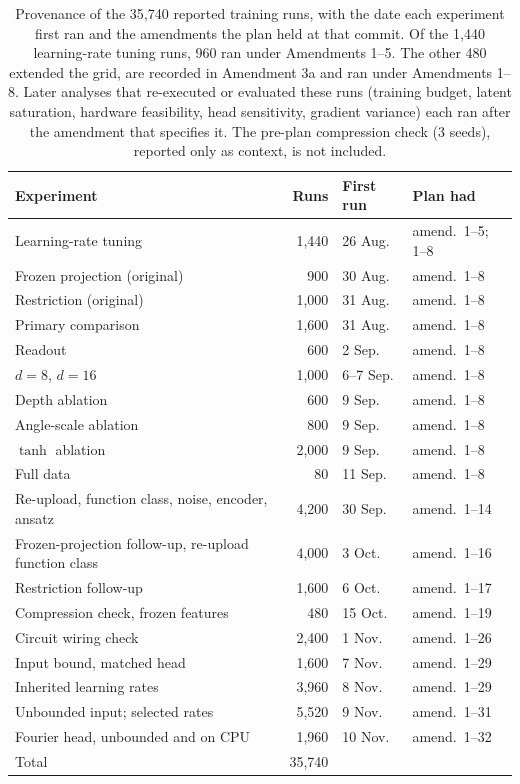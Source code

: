 \documentclass{ieeeaccess}
\begin{document}
\begin{table}[h]
\caption{Provenance of the 35,740 reported training runs, with the date each experiment first ran and the amendments the plan held at that commit. Of the 1,440 learning-rate tuning runs, 960 ran under Amendments 1--5. The other 480 extended the grid, are recorded in Amendment 3a and ran under Amendments 1--8. Later analyses that re-executed or evaluated these runs (training budget, latent saturation, hardware feasibility, head sensitivity, gradient variance) each ran after the amendment that specifies it. The pre-plan compression check (3 seeds), reported only as context, is not included.}
\label{tab:provenance}
\centering
\setlength{\tabcolsep}{3pt}
\footnotesize
\begin{tabular}{@{}L{3.9cm}rll@{}}
\toprule
Experiment & Runs & First run & Plan had\\
\midrule
Learning-rate tuning & 1,440 & 26 Aug. & amend.\ 1--5; 1--8\\
Frozen projection (original) & 900 & 30 Aug. & amend.\ 1--8\\
Restriction (original) & 1,000 & 31 Aug. & amend.\ 1--8\\
Primary comparison & 1,600 & 31 Aug. & amend.\ 1--8\\
Readout & 600 & 2 Sep. & amend.\ 1--8\\
$d=8$, $d=16$ & 1,000 & 6--7 Sep. & amend.\ 1--8\\
Depth ablation & 600 & 9 Sep. & amend.\ 1--8\\
Angle-scale ablation & 800 & 9 Sep. & amend.\ 1--8\\
$\tanh$ ablation & 2,000 & 9 Sep. & amend.\ 1--8\\
Full data & 80 & 11 Sep. & amend.\ 1--8\\
Re-upload, function class, noise, encoder, ansatz & 4,200 & 30 Sep. & amend.\ 1--14\\
Frozen-projection follow-up, re-upload function class & 4,000 & 3 Oct. & amend.\ 1--16\\
Restriction follow-up & 1,600 & 6 Oct. & amend.\ 1--17\\
Compression check, frozen features & 480 & 15 Oct. & amend.\ 1--19\\
Circuit wiring check & 2,400 & 1 Nov. & amend.\ 1--26\\
Input bound, matched head & 1,600 & 7 Nov. & amend.\ 1--29\\
Inherited learning rates & 3,960 & 8 Nov. & amend.\ 1--29\\
Unbounded input; selected rates & 5,520 & 9 Nov. & amend.\ 1--31\\
Fourier head, unbounded and on CPU & 1,960 & 10 Nov. & amend.\ 1--32\\
\midrule
Total & 35,740 & & \\
\bottomrule
\end{tabular}
\end{table}
\end{document}
